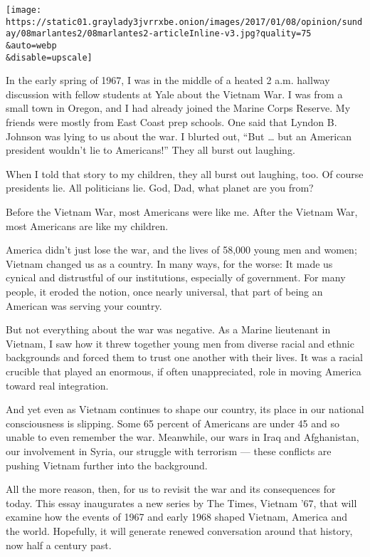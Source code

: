 \texttt{[image: https://static01.graylady3jvrrxbe.onion/images/2017/01/08/opinion/sunday/08marlantes2/08marlantes2-articleInline-v3.jpg?quality=75\\\&auto=webp\\\&disable=upscale]}

In the early spring of 1967, I was in the middle of a heated 2 a.m.
hallway discussion with fellow students at Yale about the Vietnam War. I
was from a small town in Oregon, and I had already joined the Marine
Corps Reserve. My friends were mostly from East Coast prep schools. One
said that Lyndon B. Johnson was lying to us about the war. I blurted
out, ``But \ldots{} but an American president wouldn't lie to
Americans!'' They all burst out laughing.

When I told that story to my children, they all burst out laughing, too.
Of course presidents lie. All politicians lie. God, Dad, what planet are
you from?

Before the Vietnam War, most Americans were like me. After the Vietnam
War, most Americans are like my children.

America didn't just lose the war, and the lives of 58,000 young men and
women; Vietnam changed us as a country. In many ways, for the worse: It
made us cynical and distrustful of our institutions, especially of
government. For many people, it eroded the notion, once nearly
universal, that part of being an American was serving your country.

But not everything about the war was negative. As a Marine lieutenant in
Vietnam, I saw how it threw together young men from diverse racial and
ethnic backgrounds and forced them to trust one another with their
lives. It was a racial crucible that played an enormous, if often
unappreciated, role in moving America toward real integration.

And yet even as Vietnam continues to shape our country, its place in our
national consciousness is slipping. Some 65 percent of Americans are
under 45 and so unable to even remember the war. Meanwhile, our wars in
Iraq and Afghanistan, our involvement in Syria, our struggle with
terrorism --- these conflicts are pushing Vietnam further into the
background.

All the more reason, then, for us to revisit the war and its
consequences for today. This essay inaugurates a new series by The
Times, Vietnam '67, that will examine how the events of 1967 and early
1968 shaped Vietnam, America and the world. Hopefully, it will generate
renewed conversation around that history, now half a century past.


